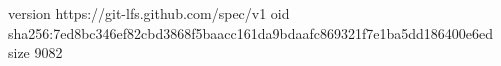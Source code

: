 version https://git-lfs.github.com/spec/v1
oid sha256:7ed8bc346ef82cbd3868f5baacc161da9bdaafc869321f7e1ba5dd186400e6ed
size 9082
